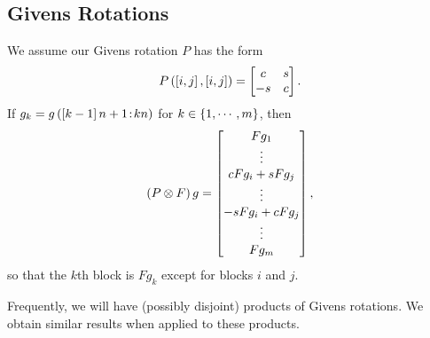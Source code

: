 \subsection{Givens Rotations}
\label{ssec:FastKronProdGivens}

We assume our Givens rotation $P$ has the form
%
\begin{equation}
    P\left( \left[ i,j \right],\left[ i,j \right] \right) =
        \begin{bmatrix} c & s \\ -s & c \end{bmatrix}.
\end{equation}
%
If $g_{k} = g\left( \left[ k-1 \right]n + 1\!:\!kn \right)$ for
$k\in\left\{ 1,\cdots,m \right\}$, then
%
\begin{equation}
    \left( P\otimes F \right)g = \begin{bmatrix}
        Fg_{1} \\ \vdots \\ cFg_{i} + sFg_{j} \\ \vdots \\ -sFg_{i} + cFg_{j} \\
        \vdots \\ Fg_{m} \end{bmatrix},
\end{equation}
%
so that the $k$th block is $Fg_{k}$ except for blocks $i$ and $j$.

Frequently, we will have (possibly disjoint) products of Givens rotations.
We obtain similar results when applied to these products.
